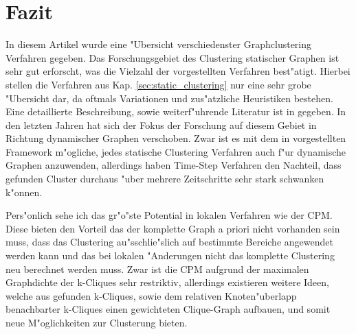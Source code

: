 \documentclass[journal]{vgtc}
\begin{document}
\section{Fazit}
  In diesem Artikel wurde eine "Ubersicht verschiedenster Graphclustering Verfahren gegeben. Das Forschungsgebiet des Clustering statischer Graphen ist sehr gut
  erforscht, was die Vielzahl der vorgestellten Verfahren best"atigt. Hierbei stellen die Verfahren aus Kap. \ref{sec:static_clustering} nur eine sehr grobe "Ubersicht
  dar, da oftmals Variationen und zus"atzliche Heuristiken bestehen. Eine detaillierte Beschreibung, sowie weiterf"uhrende Literatur ist in \cite{Schaeffer} gegeben.
  In den letzten Jahren hat sich der Fokus der Forschung auf diesem Gebiet in Richtung dynamischer Graphen verschoben. Zwar ist es mit dem in \cite{timestep} vorgestellten
  Framework m"ogliche, jedes statische Clustering Verfahren auch f"ur dynamische Graphen anzuwenden, allerdings haben Time-Step Verfahren den Nachteil, dass gefunden Cluster
  durchaus "uber mehrere Zeitschritte sehr stark schwanken k"onnen.
  
  Pers"onlich sehe ich das gr"o"ste Potential in lokalen Verfahren wie der CPM. Diese bieten den Vorteil das der komplette Graph a priori nicht vorhanden sein muss, 
  dass das Clustering au"sschlie"slich auf bestimmte Bereiche angewendet werden kann und das bei lokalen "Anderungen nicht das komplette Clustering neu berechnet werden muss.
  Zwar ist die CPM aufgrund der maximalen Graphdichte der k-Cliques sehr restriktiv, allerdings existieren weitere Ideen, welche aus gefunden k-Cliques, sowie dem
  relativen Knoten"uberlapp benachbarter k-Cliques einen gewichteten Clique-Graph\cite{clique_graph} aufbauen, und somit neue M"oglichkeiten zur Clusterung bieten.
    


\end{document}

